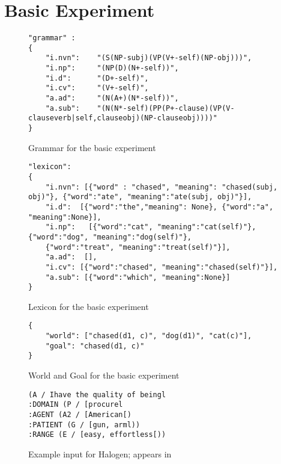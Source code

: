 \section{Basic Experiment}

\begin{figure}[h]
\caption{Grammar for the basic experiment}
\begin{lstlisting}
"grammar" :
{
    "i.nvn":    "(S(NP-subj)(VP(V+-self)(NP-obj)))",
    "i.np":     "(NP(D)(N+-self))",
    "i.d":      "(D+-self)",
    "i.cv":     "(V+-self)",
    "a.ad":     "(N(A+)(N*-self))",
    "a.sub":    "(N(N*-self)(PP(P+-clause)(VP(V-clauseverb|self,clauseobj)(NP-clauseobj))))"
}
\end{lstlisting}
\end{figure}

\begin{figure}[h]
\caption{Lexicon for the basic experiment}
\begin{lstlisting}
"lexicon":
{
    "i.nvn": [{"word" : "chased", "meaning": "chased(subj, obj)"}, {"word":"ate", "meaning":"ate(subj, obj)"}],
    "i.d":  [{"word":"the","meaning": None}, {"word":"a", "meaning":None}],
    "i.np":   [{"word":"cat", "meaning":"cat(self)"}, {"word":"dog", "meaning":"dog(self)"}, 
    {"word":"treat", "meaning":"treat(self)"}],
    "a.ad":  [],
    "i.cv": [{"word":"chased", "meaning":"chased(self)"}],
    "a.sub": [{"word":"which", "meaning":None}]
}
\end{lstlisting}
\end{figure}

\begin{figure}[h]
\caption{World and Goal for the basic experiment}
\begin{lstlisting}
{
    "world": ["chased(d1, c)", "dog(d1)", "cat(c)"],
    "goal": "chased(d1, c)"
}
\end{lstlisting}
\end{figure}

\begin{figure}[h]
\caption{Example input for Halogen; appears in \cite{knight_1995_genselect}}
\begin{lstlisting}
(A / Ihave the quality of beingl 
:DOMAIN (P / [procurel 
:AGENT (A2 / [American[) 
:PATIENT (G / [gun, arml)) 
:RANGE (E / [easy, effortless[)) 
\end{lstlisting}
\label{halogen-example}
\end{figure}